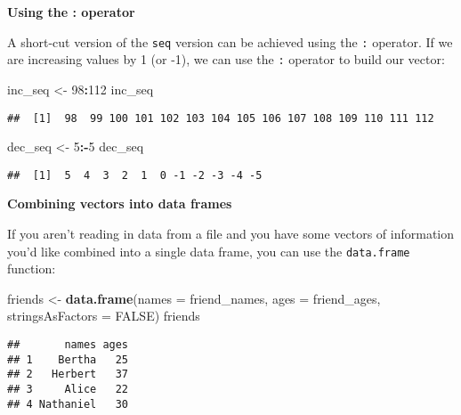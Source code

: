 \documentclass[]{tufte-book}
\newenvironment{Shaded}{\begin{snugshade}}{\end{snugshade}}
\newcommand{\DataTypeTok}[1]{\textcolor[rgb]{0.13,0.29,0.53}{#1}}
\newcommand{\DecValTok}[1]{\textcolor[rgb]{0.00,0.00,0.81}{#1}}
\newcommand{\KeywordTok}[1]{\textcolor[rgb]{0.13,0.29,0.53}{\textbf{#1}}}
\newcommand{\NormalTok}[1]{#1}
\newcommand{\OperatorTok}[1]{\textcolor[rgb]{0.81,0.36,0.00}{\textbf{#1}}}
\newcommand{\OtherTok}[1]{\textcolor[rgb]{0.56,0.35,0.01}{#1}}
\newcommand{\StringTok}[1]{\textcolor[rgb]{0.31,0.60,0.02}{#1}}
\begin{document}
\noindent\textbf{Using the : operator}\vspace*{0.1in}

A short-cut version of the \texttt{seq} version can be achieved using the \texttt{:} operator. If we are increasing values by 1 (or -1), we can use the \texttt{:} operator to build our vector:

\begin{Shaded}
\begin{Highlighting}[]
\NormalTok{inc_seq <-}\StringTok{ }\DecValTok{98}\OperatorTok{:}\DecValTok{112}
\NormalTok{inc_seq}
\end{Highlighting}
\end{Shaded}

\begin{verbatim}
##  [1]  98  99 100 101 102 103 104 105 106 107 108 109 110 111 112
\end{verbatim}

\begin{Shaded}
\begin{Highlighting}[]
\NormalTok{dec_seq <-}\StringTok{ }\DecValTok{5}\OperatorTok{:-}\DecValTok{5}
\NormalTok{dec_seq}
\end{Highlighting}
\end{Shaded}

\begin{verbatim}
##  [1]  5  4  3  2  1  0 -1 -2 -3 -4 -5
\end{verbatim}

\vspace*{0.2in}

\noindent\textbf{Combining vectors into data frames}\vspace*{0.1in}

If you aren't reading in data from a file and you have some vectors of information you'd like combined into a single data frame, you can use the \texttt{data.frame} function:

\begin{Shaded}
\begin{Highlighting}[]
\NormalTok{friends <-}\StringTok{ }\KeywordTok{data.frame}\NormalTok{(}\DataTypeTok{names =}\NormalTok{ friend_names,}
           \DataTypeTok{ages =}\NormalTok{ friend_ages,}
           \DataTypeTok{stringsAsFactors =} \OtherTok{FALSE}\NormalTok{)}
\NormalTok{friends}
\end{Highlighting}
\end{Shaded}

\begin{verbatim}
##       names ages
## 1    Bertha   25
## 2   Herbert   37
## 3     Alice   22
## 4 Nathaniel   30
\end{verbatim}
\end{document}
